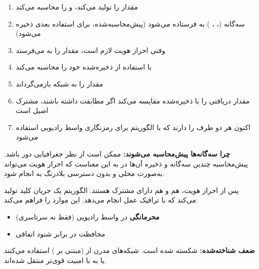 \begin{enumerate}
\def\labelenumi{\arabic{enumi}.}
\tightlist
\item
   مقدار  را تولید می‌کند،  و  را محاسبه می‌کند
\item
  سه‌گانه (، ، ) به  فرستاده می‌شود (پیش‌محاسبه‌شده، برای استفاده بعدی ذخیره می‌شود)
\item
  وقتی احراز هویت لازم است،  مقدار  را به  می‌فرستد
\item
   با استفاده از  ذخیره‌شده خود  را محاسبه می‌کند
\item
   مقدار  را به شبکه بازمی‌گرداند
\item
   مقدار  دریافتی را با  ذخیره‌شده مقایسه می‌کند  اگر مطابقت داشته باشند، مشترک اصیل است
\item
  اکنون هر دو طرف  را دارند  که با الگوریتم  برای رمزنگاری واسط رادیویی استفاده می‌شود
\end{enumerate}

\textbf{چرا سه‌گانه‌ها پیش‌محاسبه می‌شوند:}  ممکن است از نظر جغرافیایی دور باشد. پیش‌محاسبه چندین سه‌گانه و ذخیره آن‌ها در  به این معناست که احراز هویت می‌تواند به‌صورت محلی و بدون دسترسی بلادرنگ به  انجام شود.


پس از احراز هویت، هم  و هم  دارای  مشترک هستند. الگوریتم  یک جریان کلید تولید می‌کند که با ترافیک عمل  انجام می‌دهد. این موارد را فراهم می‌کند:

\begin{itemize}
\tightlist
\item
  \textbf{محرمانگی} در واسط رادیویی (فقط   نه سرتاسری)
\item
  محافظت در برابر شنود اتفاقی
\end{itemize}

\textbf{ضعف شناخته‌شده:}  شکسته شده است. شبکه‌های مدرن از  (مبتنی بر ) استفاده می‌کنند یا به  با امنیت قوی‌تر منتقل شده‌اند.


